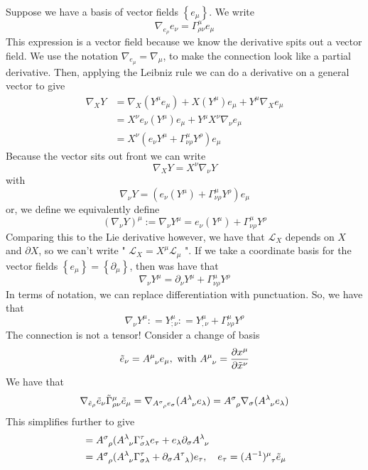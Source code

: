 Suppose we have a basis of vector fields $ \left\{  e_ \mu  \right\} $. 
We write 
\[
 \nabla _{ e _ \rho } e_{ \nu } = \Gamma^ \mu _{ \rho \nu } e _{ \mu } 
\] This expression is a vector field because we know 
the derivative spits out a vector field.
We use the notation $ \nabla _{ e _ \mu }  = \nabla _ \mu $, 
to make the connection look like a partial derivative. Then, applying the 
Leibniz rule we can do a derivative on a general vector to give 
\begin{align*}
	\nabla _ X Y & = \nabla _ X ( Y ^ \mu e_{\mu  } ) + X ( Y ^ \mu ) e_\mu + Y ^\mu \nabla _ X e _\mu \\
		     &=  X ^ \nu e_\nu ( Y ^\mu ) e _\mu + Y ^\mu X^\nu \nabla _ \nu e _ \mu  \\
		     &=  X ^ \nu ( e _ \nu Y ^ \mu  + \Gamma^\mu _{ \nu \rho } Y ^ \rho ) e _ \mu  
\end{align*}
Because the vector sits out front we can write 
\[
 \nabla _ X Y  = X^ \nu \nabla _ \nu  Y 
\]  with 
\[
	\nabla _ \nu Y = ( e _ \nu ( Y ^ \mu ) + \Gamma^ \mu _{ \nu \rho } Y ^ \rho ) e _ \mu 
\] or, we define we equivalently define 
\[
	( \nabla _ \nu Y ) ^ \mu := \nabla _ \nu Y ^ \mu = e _ \nu ( Y ^ \mu ) + \Gamma ^ \mu _{ \nu \rho } Y ^ \rho 
\] Comparing this to the Lie derivative however, 
we have that $ \mathcal{ L } _ X $ depends on $ X $ and $ \partial X $,
so we can't write " $ \mathcal{ L }_ X = X ^ \mu \mathcal{ L } _ \mu $ ". 
If we take a coordinate basis 
for the vector fields $ \left\{  e _  \mu  \right\}  = \left\{  \partial  _ \mu  \right\} $, 
then was have that 
\[
 \nabla _ \nu Y ^ \mu = \partial  _ \nu Y ^ \mu + \Gamma ^ \mu _{ \nu \rho } Y ^ \rho 
\] In terms of notation, we can replace differentiation with  
punctuation. So, we have that 
\[
 \nabla _ \nu Y ^ \mu : = Y ^ \mu _{ ; \nu } : = Y ^ \mu_{ , \nu } + \Gamma^ \mu _{ \nu \rho } Y ^ \rho 
\] 
The connection is not a tensor! Consider a change of basis 
\[
	\tilde{ e } _ \nu = A \indices{ ^\mu _\nu } e_\mu, \text{ with } A \indices{ ^\mu _\nu} = \frac{\partial x^\mu }{\partial \tilde{x} ^\nu}    
\]  
We have that 
\[
\nabla _{ \tilde{e } _ \rho  } \tilde{ e } _ \nu \tilde{ \Gamma } ^ \mu _{ \rho \nu } \tilde{ e } _ \mu  = \nabla _{ A \indices{ ^\sigma _ \rho } e _ \sigma  } ( A \indices{ ^ \lambda _ \nu } e _ \lambda )  = A \indices{ ^ \sigma _ \rho } \nabla _ \sigma ( A \indices{ ^ \lambda _ \nu  } e _ \lambda  )        
\]  This simplifies further to give 
\begin{align*}
	&=  A \indices{ ^ \sigma _ \rho } ( A \indices{ ^ \lambda _ \nu  } \Gamma ^ \tau _{ \sigma \lambda  } e _ \tau + e _ \lambda \partial  _ \sigma A \indices{ ^ \lambda _ \nu }     \\
	&=  A \indices{ ^ \sigma _ \rho } ( A \indices{ ^ \lambda _ \nu } \Gamma ^ \tau _{ \sigma \lambda } + \partial  _ \sigma A \indices{ ^ \tau _ \lambda } ) e _ \tau     , \quad e _ \tau = ( A^{ -1 } ) \indices{ ^ \mu _ \tau  } \tilde{ e } _ \mu  	 
\end{align*}
